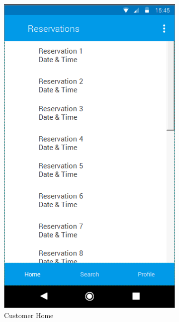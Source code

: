 \begin{figure}[h]
\centering
\begin{subfigure}{.5\textwidth}
  \centering
  \includegraphics[height=.4\textheight, keepaspectratio=true]{Img/Mockup_Customer_Home}
  \caption{Customer Home}
\end{subfigure}%
\begin{subfigure}{.5\textwidth}
  \centering

\end{subfigure}
\end{figure}
